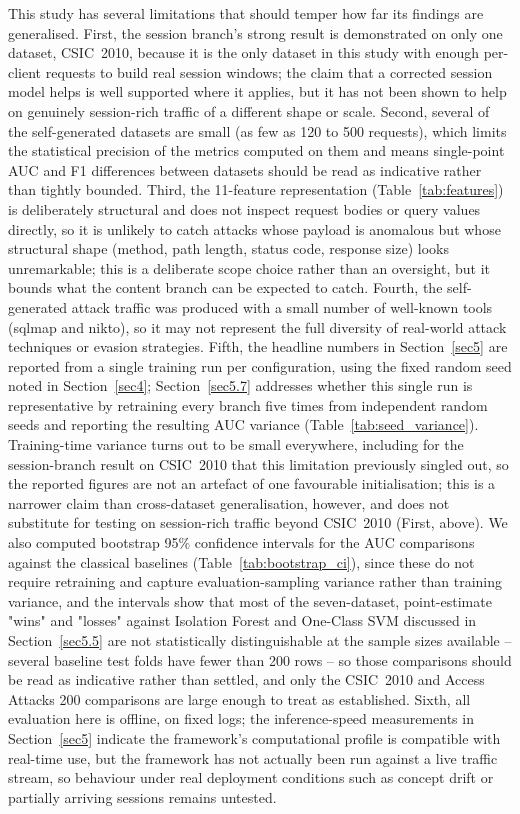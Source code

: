 \documentclass[futureinternet,article,submit,moreauthors]{Definitions/mdpi}
\begin{document}
This study has several limitations that should temper how far its findings are generalised. First, the session branch's strong result is demonstrated on only one dataset, CSIC~2010, because it is the only dataset in this study with enough per-client requests to build real session windows; the claim that a corrected session model helps is well supported where it applies, but it has not been shown to help on genuinely session-rich traffic of a different shape or scale. Second, several of the self-generated datasets are small (as few as 120 to 500 requests), which limits the statistical precision of the metrics computed on them and means single-point AUC and F1 differences between datasets should be read as indicative rather than tightly bounded. Third, the 11-feature representation (Table~\ref{tab:features}) is deliberately structural and does not inspect request bodies or query values directly, so it is unlikely to catch attacks whose payload is anomalous but whose structural shape (method, path length, status code, response size) looks unremarkable; this is a deliberate scope choice rather than an oversight, but it bounds what the content branch can be expected to catch. Fourth, the self-generated attack traffic was produced with a small number of well-known tools (sqlmap and nikto), so it may not represent the full diversity of real-world attack techniques or evasion strategies. Fifth, the headline numbers in Section~\ref{sec5} are reported from a single training run per configuration, using the fixed random seed noted in Section~\ref{sec4}; Section~\ref{sec5.7} addresses whether this single run is representative by retraining every branch five times from independent random seeds and reporting the resulting AUC variance (Table~\ref{tab:seed_variance}). Training-time variance turns out to be small everywhere, including for the session-branch result on CSIC~2010 that this limitation previously singled out, so the reported figures are not an artefact of one favourable initialisation; this is a narrower claim than cross-dataset generalisation, however, and does not substitute for testing on session-rich traffic beyond CSIC~2010 (First, above). We also computed bootstrap 95\% confidence intervals for the AUC comparisons against the classical baselines (Table~\ref{tab:bootstrap_ci}), since these do not require retraining and capture evaluation-sampling variance rather than training variance, and the intervals show that most of the seven-dataset, point-estimate "wins" and "losses" against Isolation Forest and One-Class SVM discussed in Section~\ref{sec5.5} are not statistically distinguishable at the sample sizes available -- several baseline test folds have fewer than 200 rows -- so those comparisons should be read as indicative rather than settled, and only the CSIC~2010 and Access Attacks 200 comparisons are large enough to treat as established. Sixth, all evaluation here is offline, on fixed logs; the inference-speed measurements in Section~\ref{sec5} indicate the framework's computational profile is compatible with real-time use, but the framework has not actually been run against a live traffic stream, so behaviour under real deployment conditions such as concept drift or partially arriving sessions remains untested.
\end{document}
